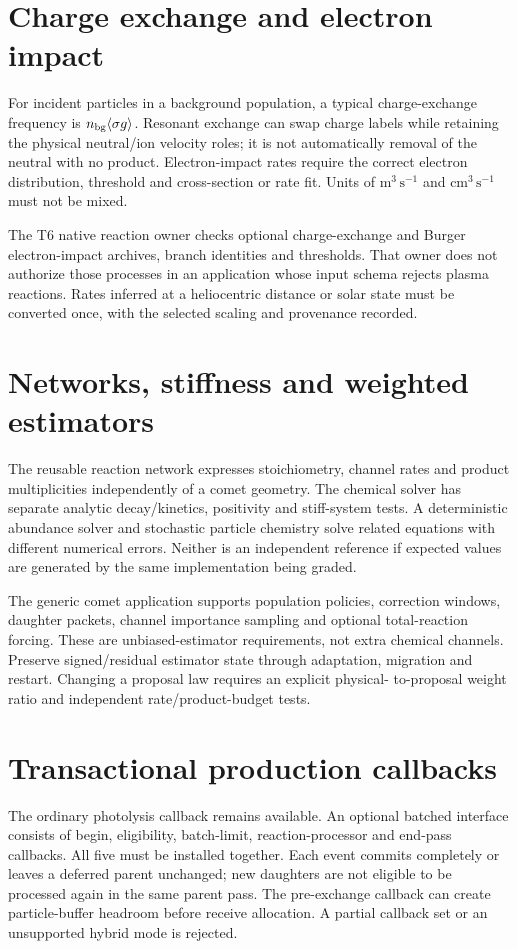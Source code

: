 \section{Charge exchange and electron impact}
For incident particles in a background population, a typical charge-exchange
frequency is $n_{\rm bg}\langle\sigma g\rangle$. Resonant exchange can swap
charge labels while retaining the physical neutral/ion velocity roles; it
is not automatically removal of the neutral with no product. Electron-impact
rates require the correct electron distribution, threshold and cross-section
or rate fit. Units of $\mathrm{m^3\,s^{-1}}$ and $\mathrm{cm^3\,s^{-1}}$
must not be mixed.

The T6 native reaction owner checks optional charge-exchange and Burger
electron-impact archives, branch identities and thresholds. That owner does
not authorize those processes in an application whose input schema rejects
plasma reactions. Rates inferred at a heliocentric distance or solar state
must be converted once, with the selected scaling and provenance recorded.

\section{Networks, stiffness and weighted estimators}
The reusable reaction network expresses stoichiometry, channel rates and
product multiplicities independently of a comet geometry.
The chemical solver has separate analytic decay/kinetics, positivity and
stiff-system tests. A deterministic abundance solver and stochastic
particle chemistry solve related equations with different numerical errors.
Neither is an independent reference if expected values are generated by the
same implementation being graded.

The generic comet application supports population policies, correction windows,
daughter packets, channel importance sampling and optional total-reaction
forcing. These are unbiased-estimator requirements, not extra chemical
channels. Preserve signed/residual estimator state through adaptation,
migration and restart. Changing a proposal law requires an explicit physical-
to-proposal weight ratio and independent rate/product-budget tests.

\section{Transactional production callbacks}
The ordinary photolysis callback remains available. An optional batched
interface consists of begin, eligibility, batch-limit, reaction-processor
and end-pass callbacks. All five must be installed together.
Each event commits completely or leaves a deferred parent unchanged;
new daughters are not eligible to be processed again in the same parent pass.
The pre-exchange callback can create particle-buffer headroom before receive
allocation. A partial callback set or an unsupported hybrid mode is rejected.

